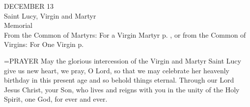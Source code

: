 \begin{center}\normalsize DECEMBER 13\\
\footnotesize Saint Lucy, Virgin and Martyr\\
\footnotesize Memorial\\
\footnotesize From the Common of Martyrs: For a Virgin Martyr p.   , or from the Common of\\
\footnotesize Virgins: For One Virgin p.\\
\end{center}

\hangindent=\parindent \small{PRAYER 
May the glorious intercession
of the Virgin and Martyr Saint Lucy
give us new heart, we pray, O Lord,
so that we may celebrate her heavenly birthday
in this present age
and so behold things eternal.
Through our Lord Jesus Christ, your Son,
who lives and reigns with you in the unity of the Holy Spirit,
one God, for ever and ever.\\}
 
